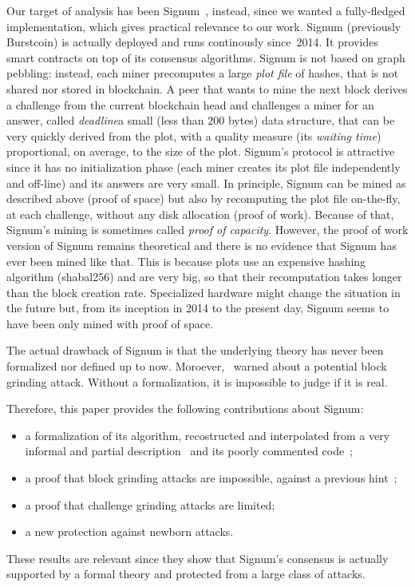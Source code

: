 Our target of analysis has been Signum~\cite{Signum}, instead, since we wanted a fully-fledged implementation,
which gives practical relevance to our work. Signum (previously Burstcoin) is
actually deployed and runs continously since~2014. It provides smart contracts on top of its consensus algorithms.
Signum is not based on graph pebbling: instead,
each miner precomputes a large \emph{plot file} of hashes, that is not shared nor
stored in blockchain.
A peer that wants to mine the next block derives a challenge from the current blockchain head
and challenges a miner for an answer, called
\emph{deadline}\ie a small (less than $200$ bytes) data structure, that can be very quickly
derived from the plot, with a quality measure
(its \emph{waiting time}) proportional, on average, to the size of the plot.
Signum's protocol is attractive since it has no initialization phase (each miner creates its plot file
independently and off-line) and its answers are very small.
In principle, Signum can be mined as described above (proof of space)
but also by recomputing the plot file on-the-fly, at each challenge, without any disk allocation
(proof of work). Because of that, Signum's mining is sometimes called \emph{proof of capacity}.
However, the proof of work version of Signum remains theoretical and there is no evidence that Signum has ever
been mined like that. This is because plots use an expensive hashing algorithm (shabal256) and are very big, so that their recomputation takes longer than the block creation rate.
Specialized hardware might change the situation in the future but, from its inception in 2014 to
the present day, Signum seems to have been only mined with proof of space.

The actual drawback of Signum is that the underlying theory has never been formalized nor defined up to now.
Moroever, \cite{ParkKFGAP18}~warned about a potential block grinding attack.
Without a formalization, it is impossible to judge if it is real.

Therefore, this paper provides the following contributions about Signum:
%
\begin{itemize}
\item a formalization of its algorithm, recostructed and interpolated from a very informal and partial
  description~\cite{SignumPlotting} and its poorly commented code~\cite{SignumSource};
\item a proof that block grinding attacks are impossible, against a previous hint~\cite{ParkKFGAP18};
\item a proof that challenge grinding attacks are limited;
\item a new protection against newborn attacks.
\end{itemize}
%
These results are relevant since they show that Signum's consensus
is actually supported by a formal theory and protected from a large class of attacks.

